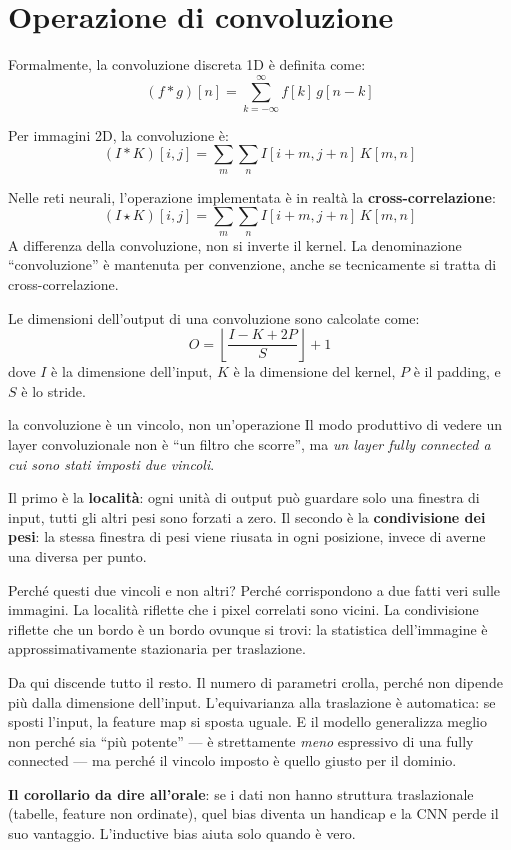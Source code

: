 \section{Operazione di convoluzione}

Formalmente, la convoluzione discreta 1D è definita come:
\[
(f * g)[n] = \sum_{k=-\infty}^{\infty} f[k] \, g[n-k]
\]

Per immagini 2D, la convoluzione è:
\[
(I * K)[i,j] = \sum_{m} \sum_{n} I[i+m, j+n] \, K[m,n]
\]

\begin{tcolorbox}[title=Nota: Cross-correlazione vs Convoluzione]
Nelle reti neurali, l'operazione implementata è in realtà la \textbf{cross-correlazione}:
\[
(I \star K)[i,j] = \sum_{m} \sum_{n} I[i+m, j+n] \, K[m,n]
\]
A differenza della convoluzione, non si inverte il kernel. La denominazione ``convoluzione'' è mantenuta per convenzione, anche se tecnicamente si tratta di cross-correlazione.
\end{tcolorbox}

Le dimensioni dell'output di una convoluzione sono calcolate come:
\[
O = \left\lfloor \frac{I - K + 2P}{S} \right\rfloor + 1
\]
dove $I$ è la dimensione dell'input, $K$ è la dimensione del kernel, $P$ è il padding, e $S$ è lo stride.

\begin{intuizione}{la convoluzione è un vincolo, non un'operazione}
Il modo produttivo di vedere un layer convoluzionale non è ``un filtro che scorre'', ma \emph{un layer fully connected a cui sono stati imposti due vincoli}.

Il primo è la \textbf{località}: ogni unità di output può guardare solo una finestra di input, tutti gli altri pesi sono forzati a zero. Il secondo è la \textbf{condivisione dei pesi}: la stessa finestra di pesi viene riusata in ogni posizione, invece di averne una diversa per punto.

Perché questi due vincoli e non altri? Perché corrispondono a due fatti veri sulle immagini. La località riflette che i pixel correlati sono vicini. La condivisione riflette che un bordo è un bordo ovunque si trovi: la statistica dell'immagine è approssimativamente stazionaria per traslazione.

Da qui discende tutto il resto. Il numero di parametri crolla, perché non dipende più dalla dimensione dell'input. L'equivarianza alla traslazione è automatica: se sposti l'input, la feature map si sposta uguale. E il modello generalizza meglio non perché sia ``più potente'' — è strettamente \emph{meno} espressivo di una fully connected — ma perché il vincolo imposto è quello giusto per il dominio.

\textbf{Il corollario da dire all'orale}: se i dati non hanno struttura traslazionale (tabelle, feature non ordinate), quel bias diventa un handicap e la CNN perde il suo vantaggio. L'inductive bias aiuta solo quando è vero.
\end{intuizione}

